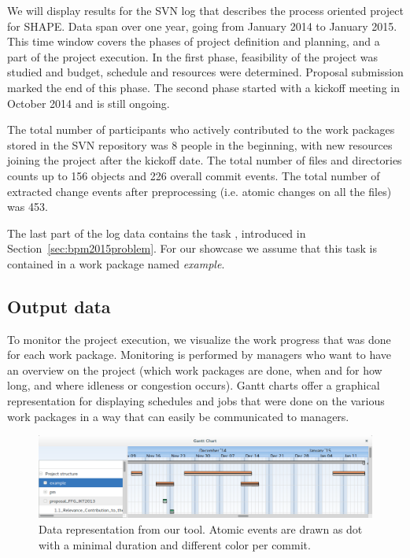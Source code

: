 We will display results for the SVN log that describes the process oriented project for SHAPE. Data span over one year, going from January 2014 to January 2015. This time window covers the phases of project definition and planning, and a part of the project execution. In the first phase, feasibility of the project was studied and budget, schedule and resources were determined. Proposal submission marked the end of this phase. The second phase started with a kickoff meeting in October 2014 and is still ongoing.

The total number of participants who actively contributed to the work packages stored in the SVN repository was 8 people in the beginning, with new resources joining the project after the kickoff date. The total number of files and directories counts up to 156 objects and 226 overall commit events. The total number of extracted change events after preprocessing (i.e. atomic changes on all the files) was 453.

The last part of the log data contains the task , introduced in Section~\ref{sec:bpm2015problem}. For our showcase we assume that this task is contained in a work package named \emph{example}.

\subsection{Output data}

To monitor the project execution, we visualize the work progress that was done for each work package. Monitoring is performed by managers who want to have an overview on the project (which work packages are done, when and for how long, and where idleness or congestion occurs). Gantt charts offer a graphical representation for displaying schedules and jobs that were done on the various work packages \cite{wilson2003gantt} in a way that can easily be communicated to managers.

\begin{figure}
\centering
\includegraphics[width=\textwidth]{bpm2015/imgs/aggregation_and_not}
\caption{Data representation from our tool. Atomic events are drawn as dot with a minimal duration and different color per commit. }
\label{fig:example-screenshot}
\end{figure}


